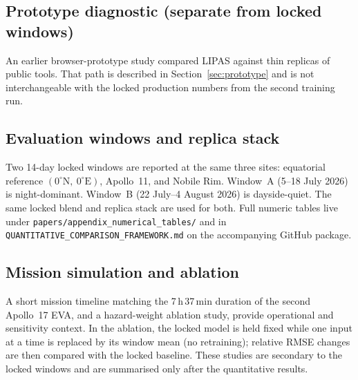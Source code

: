 \subsection{Prototype diagnostic (separate from locked windows)}

An earlier browser-prototype study compared LIPAS against thin replicas of public tools. That path is described in Section~\ref{sec:prototype} and is not interchangeable with the locked production numbers from the second training run.

\subsection{Evaluation windows and replica stack}

Two 14-day locked windows are reported at the same three sites: equatorial reference $(0^\circ\mathrm{N},\ 0^\circ\mathrm{E})$, Apollo~11, and Nobile Rim. Window~A (5--18 July 2026) is night-dominant. Window~B (22 July--4 August 2026) is dayside-quiet. The same locked blend and replica stack are used for both. Full numeric tables live under \texttt{papers/appendix\_numerical\_tables/} and in \texttt{QUANTITATIVE\_COMPARISON\_FRAMEWORK.md} on the accompanying GitHub package.

\subsection{Mission simulation and ablation}

A short mission timeline matching the 7\,h\,37\,min duration of the second Apollo~17 EVA, and a hazard-weight ablation study, provide operational and sensitivity context. In the ablation, the locked model is held fixed while one input at a time is replaced by its window mean (no retraining); relative RMSE changes are then compared with the locked baseline. These studies are secondary to the locked windows and are summarised only after the quantitative results.
